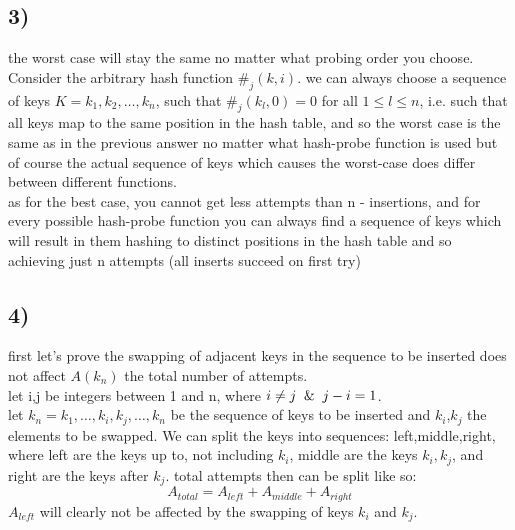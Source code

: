 \documentclass{report}
\begin{document}
\subsection*{3)}
the worst case will stay the same no matter what probing order you choose. Consider the arbitrary hash function $\#_{j}(k,i)$. we can always choose a sequence of keys $K = k_{1},k_{2},\hdots,k_{n}$, such that $\#_{j}(k_{l},0) = 0$ for all $1 \leq l \leq n$, i.e. such that all keys map to the same position in the hash table, and so the worst case is the same as in the previous answer no matter what hash-probe function is used but of course the actual sequence of keys which causes the worst-case does differ between different functions.\\
as for the best case, you cannot get less attempts than n - insertions, and for every possible hash-probe function you can always find a sequence of keys which will result in them hashing to distinct positions in the hash table and so achieving just n attempts (all inserts succeed on first try)
\subsection*{4)}
first let's prove the swapping of adjacent keys in the sequence to be inserted does not affect $A(k_{n})$ the total number of attempts.\\
let i,j be integers between 1 and n, where $i \neq j \And j - i = 1$.\\
let $k_{n} = k_{1},\hdots,k_{i},k_{j},\hdots,k_{n}$ be the sequence of keys to be inserted and $k_{i}$,$k_{j}$ the elements to be swapped.
We can split the keys into sequences: left,middle,right, where left are the keys up to, not including $k_{i}$, middle are the  keys $k_{i},k_{j}$, and right are the keys after $k_{j}$. total attempts then can be split like so:
\begin{equation*}
 A_{total} = A_{left} + A_{middle} + A_{right}
\end{equation*}%
$A_{left}$ will clearly not be affected by the swapping of keys $k_{i}$ and $k_{j}$.\\
\end{document}
